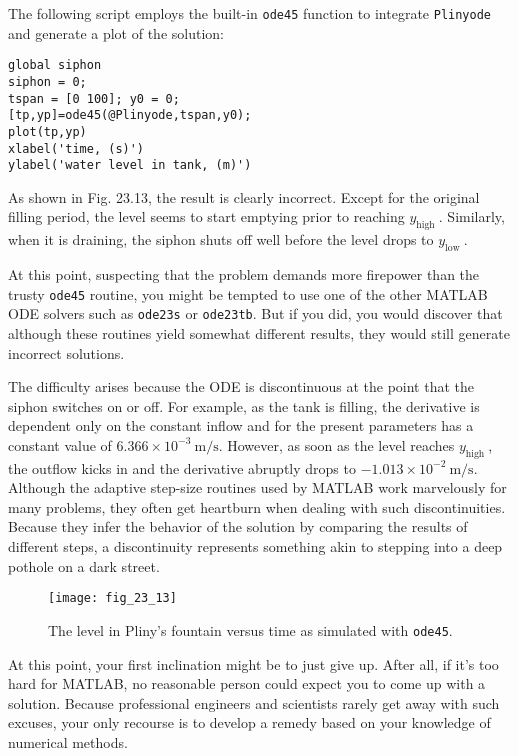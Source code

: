 \documentclass[../main.tex]{subfiles}
\begin{document}
The following script employs the built-in \texttt{ode45} function to integrate \texttt{Plinyode} and
generate a plot of the solution:
\begin{lstlisting}
global siphon
siphon = 0;
tspan = [0 100]; y0 = 0;
[tp,yp]=ode45(@Plinyode,tspan,y0);
plot(tp,yp)
xlabel('time, (s)')
ylabel('water level in tank, (m)')
\end{lstlisting}


As shown in Fig. 23.13, the result is clearly incorrect. Except for the original filling period, the level seems to start emptying prior to reaching $y_{\text {high }}$. Similarly, when it is draining, the siphon shuts off well before the level drops to $y_{\text {low }}$.

At this point, suspecting that the problem demands more firepower than the trusty \texttt{ode45} routine, you might be tempted to use one of the other MATLAB ODE solvers such as \texttt{ode23s} or \texttt{ode23tb}. But if you did, you would discover that although these routines yield somewhat different results, they would still generate incorrect solutions.

The difficulty arises because the ODE is discontinuous at the point that the siphon switches on or off. For example, as the tank is filling, the derivative is dependent only on the constant inflow and for the present parameters has a constant value of $6.366 \times 10^{-3} \mathrm{~m} / \mathrm{s}$.
However, as soon as the level reaches $y_{\text {high }}$, the outflow kicks in and the derivative abruptly drops to $-1.013 \times 10^{-2} \mathrm{~m} / \mathrm{s}$. Although the adaptive step-size routines used by MATLAB work marvelously for many problems, they often get heartburn when dealing with such discontinuities. Because they infer the behavior of the solution by comparing the results of different steps, a discontinuity represents something akin to stepping into a deep pothole on a dark street.

\begin{figure}[H]
    \centering
    \texttt{[image: fig\_23\_13]}
   \caption{\textsf{The level in Pliny's fountain versus time as simulated with \texttt{ode45}.}}\label{fig:fig_23_13}
\end{figure}

At this point, your first inclination might be to just give up. After all, if it's too hard for
MATLAB, no reasonable person could expect you to come up with a solution. Because
professional engineers and scientists rarely get away with such excuses, your only recourse
is to develop a remedy based on your knowledge of numerical methods.
\end{document}
